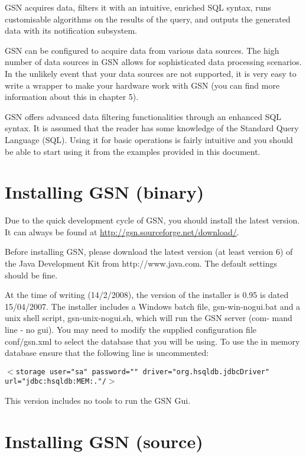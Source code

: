 GSN acquires data, filters it with an intuitive, enriched SQL syntax,
runs customisable algorithms on the results of the query, and outputs
the generated data with its notification subsystem.

GSN can be configured to acquire data from various data sources. The
high number of data sources in GSN allows for sophisticated data
processing scenarios. In the unlikely event that your data sources are
not supported, it is very easy to write a wrapper to make your hardware
work with GSN (you can find more information about this in chapter 5).

GSN offers advanced data filtering functionalities through an enhanced
SQL syntax. It is assumed that the reader has some knowledge of the
Standard Query Language (SQL). Using it for basic operations is fairly
intuitive and you should be able to start using it from the examples
provided in this document.

\section{Installing GSN (binary)}

Due to the quick development cycle of GSN, you should install the
latest version.  It can always be found at
\url{http://gsn.sourceforge.net/download/}.

Before installing GSN, please download the latest version (at least
version 6) of the Java Development Kit from http://www.java.com. The
default settings should be fine.

At the time of writing (14/2/2008), the version of the installer is
0.95 is dated 15/04/2007. The installer includes a Windows batch file,
gsn-win-nogui.bat and a unix shell script, gsn-unix-nogui.sh, which
will run the GSN server (com- mand line - no gui). You may need to
modify the supplied configuration file conf/gsn.xml to select the
database that you will be using. To use the in memory database ensure
that the following line is uncommented:

\texttt{\begin{math}<\end{math}storage user="sa" password=""
driver="org.hsqldb.jdbcDriver"
url="jdbc:hsqldb:MEM:."/\begin{math}>\end{math}}



This version includes no tools to run the GSN Gui.

\section{Installing GSN (source)}

